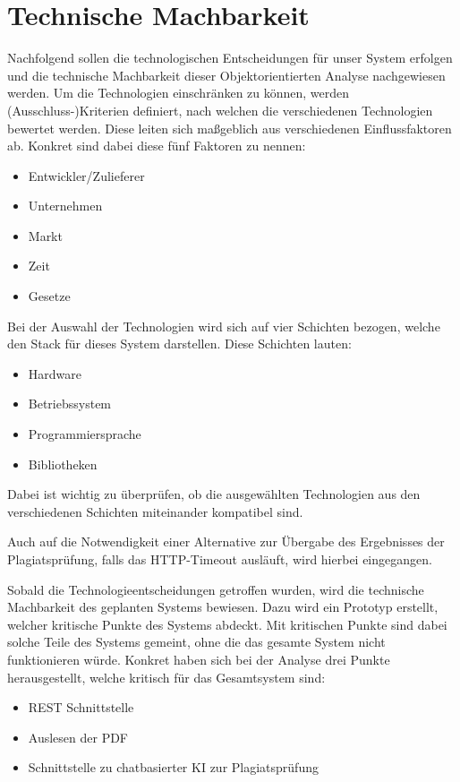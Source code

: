 \chapter{Technische Machbarkeit}\label{ch:technische-machbarkeit}
Nachfolgend sollen die technologischen Entscheidungen für unser System erfolgen
und die technische Machbarkeit dieser Objektorientierten Analyse nachgewiesen werden.
Um die Technologien einschränken zu können, werden (Ausschluss-)Kriterien definiert,
nach welchen die verschiedenen Technologien bewertet werden.
Diese leiten sich maßgeblich aus verschiedenen Einflussfaktoren ab.
Konkret sind dabei diese fünf Faktoren zu nennen:

\begin{itemize}
    \item Entwickler/Zulieferer
    \item Unternehmen
    \item Markt
    \item Zeit
    \item Gesetze
\end{itemize}

Bei der Auswahl der Technologien wird sich auf vier Schichten bezogen,
welche den Stack für dieses System darstellen.
Diese Schichten lauten:
\begin{itemize}
    \item Hardware
    \item Betriebssystem
    \item Programmiersprache
    \item Bibliotheken
\end{itemize}
Dabei ist wichtig zu überprüfen, ob die ausgewählten Technologien
aus den verschiedenen Schichten miteinander kompatibel sind.

Auch auf die Notwendigkeit einer Alternative zur Übergabe des Ergebnisses der Plagiatsprüfung,
falls das HTTP-Timeout ausläuft, wird hierbei eingegangen.

Sobald die Technologieentscheidungen getroffen wurden,
wird die technische Machbarkeit des geplanten Systems bewiesen.
Dazu wird ein Prototyp erstellt, welcher kritische Punkte des Systems abdeckt.
Mit kritischen Punkte sind dabei solche Teile des Systems gemeint,
ohne die das gesamte System nicht funktionieren würde.
Konkret haben sich bei der Analyse drei Punkte herausgestellt,
welche kritisch für das Gesamtsystem sind:
\begin{itemize}
    \item REST Schnittstelle
    \item Auslesen der PDF
    \item Schnittstelle zu chatbasierter KI zur Plagiatsprüfung
\end{itemize}

